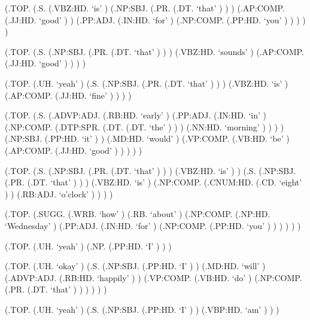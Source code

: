 \documentclass[10pt]{article}
\begin{document}
\begin{parsetree}  (.TOP. (.S. (.VBZ:HD. `is' ) (.NP:SBJ. (.PR. (.DT. `that' ) ) ) (.AP:COMP. (.JJ:HD. `good' ) ) (.PP:ADJ. (.IN:HD. `for' ) (.NP:COMP. (.PP:HD. `you' ) ) ) ) ) \end{parsetree}

\begin{parsetree}  (.TOP. (.S. (.NP:SBJ. (.PR. (.DT. `that' ) ) ) (.VBZ:HD. `sounds' ) (.AP:COMP. (.JJ:HD. `good' ) ) ) ) \end{parsetree}

\begin{parsetree}  (.TOP. (.UH. `yeah' ) (.S. (.NP:SBJ. (.PR. (.DT. `that' ) ) ) (.VBZ:HD. `is' ) (.AP:COMP. (.JJ:HD. `fine' ) ) ) ) \end{parsetree}

\begin{parsetree}  (.TOP. (.S. (.ADVP:ADJ. (.RB:HD. `early' ) (.PP:ADJ. (.IN:HD. `in' ) (.NP:COMP. (.DTP:SPR. (.DT. (.DT. `the' ) ) ) (.NN:HD. `morning' ) ) ) ) (.NP:SBJ. (.PP:HD. `it' ) ) (.MD:HD. `would' ) (.VP:COMP. (.VB:HD. `be' ) (.AP:COMP. (.JJ:HD. `good' ) ) ) ) ) \end{parsetree}

\begin{parsetree}  (.TOP. (.S. (.NP:SBJ. (.PR. (.DT. `that' ) ) ) (.VBZ:HD. `is' ) ) (.S. (.NP:SBJ. (.PR. (.DT. `that' ) ) ) (.VBZ:HD. `is' ) (.NP:COMP. (.CNUM:HD. (.CD. `eight' ) ) (.RB:ADJ. `o'clock' ) ) ) ) \end{parsetree}

\begin{parsetree}  (.TOP. (.SUGG. (.WRB. `how' ) (.RB. `about' ) (.NP:COMP. (.NP:HD. `Wednesday' ) (.PP:ADJ. (.IN:HD. `for' ) (.NP:COMP. (.PP:HD. `you' ) ) ) ) ) ) \end{parsetree}

\begin{parsetree}  (.TOP. (.UH. `yeah' ) (.NP. (.PP:HD. `I' ) ) ) \end{parsetree}

\begin{parsetree}  (.TOP. (.UH. `okay' ) (.S. (.NP:SBJ. (.PP:HD. `I' ) ) (.MD:HD. `will' ) (.ADVP:ADJ. (.RB:HD. `happily' ) ) (.VP:COMP. (.VB:HD. `do' ) (.NP:COMP. (.PR. (.DT. `that' ) ) ) ) ) ) \end{parsetree}

\begin{parsetree}  (.TOP. (.UH. `yeah' ) (.S. (.NP:SBJ. (.PP:HD. `I' ) ) (.VBP:HD. `am' ) ) ) \end{parsetree}
\end{document}
